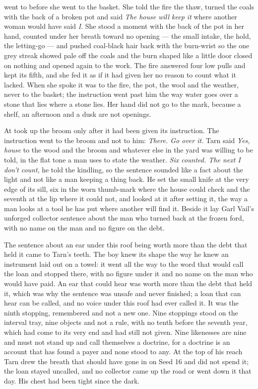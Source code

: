 \scenebreak

 went to  before she went to the basket. She told the fire the thaw, turned the coals with the back of a broken pot and said \emph{The house will keep it} where another woman would have said \emph{I}. She stood a moment with the back of the pot in her hand, counted under her breath toward no opening --- the small intake, the hold, the letting-go --- and pushed coal-black hair back with the burn-wrist so the one grey streak showed pale off the coals and the burn shaped like a little door closed on nothing and opened again to the work. The fire answered four low pulls and kept its fifth, and she fed it as if it had given her no reason to count what it lacked. When she spoke it was to the fire, the pot, the wool and the weather, never to the basket; the instruction went past him the way water goes over a stone that lies where a stone lies. Her hand did not go to the mark, because a shelf, an afternoon and a dusk are not openings.

\scenebreak

At   took up the broom only after it had been given its instruction. The instruction went to the broom and not to him: \emph{There. Go over it.} Tarn said \emph{Yes, house} to the wood and the broom and whatever else in the yard was willing to be told, in the flat tone a man uses to state the weather. \emph{Six counted. The next I don't count}, he told the kindling, so the sentence sounded like a fact about the light and not like a man keeping a thing back. He set the small knife at the very edge of its sill, six in the worn thumb-mark where the house could check and the seventh at the lip where it could not, and looked at it after setting it, the way a man looks at a tool he has put where another will find it. Beside it lay Garl Vail's unforged collector sentence about the man who turned back at the frozen ford, with no name on the man and no figure on the debt.

The sentence about an ear under this roof being worth more than the debt that held it came to Tarn's teeth. The boy knew its shape the way he knew an instrument laid out on a towel: it went all the way to the word that would call the loan and stopped there, with no figure under it and no name on the man who would have paid. An ear that could hear was worth more than the debt that held it, which was why the sentence was unsafe and never finished; a loan that can hear can be called, and no voice under this roof had ever called it. It was the ninth stopping, remembered and not a new one. Nine stoppings stood on the interval tray, nine objects and not a rule, with no tenth before the seventh year, which had come to its very end and had still not given. Nine likenesses are nine and must not stand up and call themselves a doctrine, for a doctrine is an account that has found a payer and none stood to any. At the top of his reach Tarn drew the breath that should have gone in on Seed 16 and did not spend it; the loan stayed uncalled, and no collector came up the road or went down it that day. His chest had been tight since the dark.

